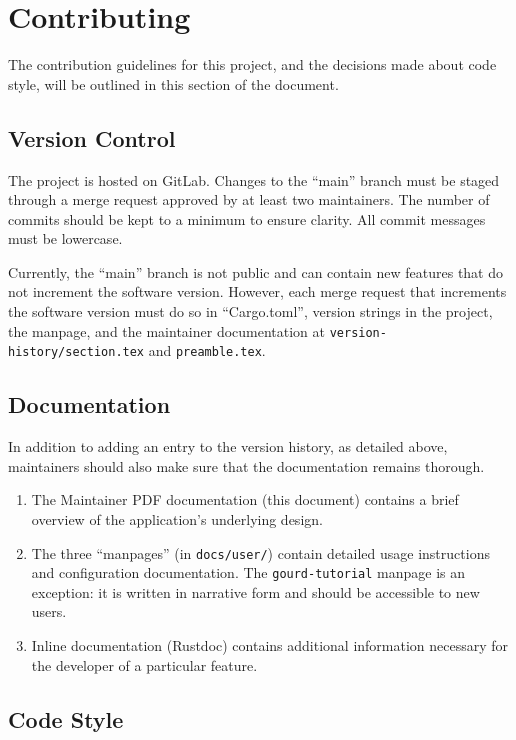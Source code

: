 \pagebreak


\section{Contributing}

The contribution guidelines for this project, and the decisions made about code style,
will be outlined in this section of the document.

\subsection{Version Control}

The project is hosted on GitLab.
Changes to the ``main'' branch must be staged through a merge request approved by at least two maintainers.
The number of commits should be kept to a minimum to ensure clarity.
All commit messages must be lowercase.

Currently, the ``main'' branch is not public and can contain new features that do not increment the software version.
However, each merge request that increments the software version must do so in ``Cargo.toml'', version strings in the project,
the manpage, and the maintainer documentation at \texttt{version-history/section.tex} and \texttt{preamble.tex}.

\subsection{Documentation}

In addition to adding an entry to the version history, as detailed above, maintainers should also make sure that the
documentation remains thorough.
\begin{enumerate}
  \item The Maintainer PDF documentation (this document) contains a brief overview of the application's underlying design.
  \item The three ``manpages'' (in \verb|docs/user/|) contain detailed usage instructions and configuration documentation.
    The \texttt{gourd-tutorial} manpage is an exception: it is written in narrative form and should be accessible to new users.
  \item Inline documentation (Rustdoc) contains additional information necessary for the developer of a particular feature.
\end{enumerate}

\subsection{Code Style}

